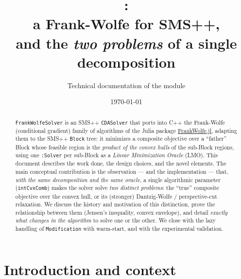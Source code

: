 \documentclass[11pt,a4paper]{article}
\title{\bfseries \code{FrankWolfeSolver}:\\
       a Frank-Wolfe \code{CDASolver} for SMS++,\\
       and the \emph{two problems} of a single decomposition}
\author{Technical documentation of the \code{FrankWolfeSolver} module}
\date{\today}
\newcommand{\code}[1]{\texttt{#1}}
\theoremstyle{plain}
\theoremstyle{remark}
\begin{document}
\maketitle

\begin{abstract}
\noindent
\code{FrankWolfeSolver} is an SMS++ \code{CDASolver} that ports into C++ the
Frank-Wolfe (conditional gradient) family of algorithms of the Julia package
\href{https://github.com/ZIB-IOL/FrankWolfe.jl}{FrankWolfe.jl}, adapting them to
the SMS++ \code{Block} tree: it minimizes a composite objective over a ``father''
Block whose feasible region is the \emph{product of the convex hulls} of the
sub-Block regions, using one \code{:Solver} per sub-Block as a \emph{Linear
Minimization Oracle} (LMO). This document describes the work done, the design
choices, and the novel elements. The main conceptual contribution is the
observation --- and the implementation --- that, \emph{with the same
decomposition and the same oracle}, a single algorithmic parameter
(\code{intCvxComb}) makes the solver solve \emph{two distinct problems}: the
``true'' composite objective over the convex hull, or its (stronger)
Dantzig-Wolfe / perspective-cut relaxation. We discuss the history and motivation
of this distinction, prove the relationship between them (Jensen's inequality,
convex envelope), and detail \emph{exactly what changes in the algorithm} to
solve one or the other. We close with the lazy handling of \code{Modification}
with warm-start, and with the experimental validation.
\end{abstract}

\section{Introduction and context}\label{sec:intro}
\end{document}
